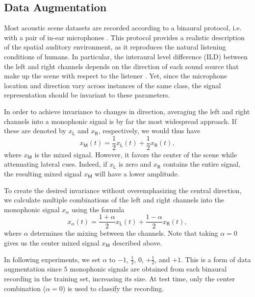 \documentclass{article}
\begin{document}
\begin{sloppy}
\section{Data Augmentation}
\label{sec:augment}

Most acoustic scene datasets are recorded according to a binaural protocol, i.e. with a pair of in-ear microphones \cite{Wang2006}. This protocol provides a realistic description of the spatial auditory environment, as it reproduces the natural listening conditions of humans. In particular, the interaural level difference (ILD) between the left and right channels depends on the direction of each sound source that make up the scene with respect to the listener \cite{Blauert2004}. Yet, since the microphone location and direction vary across instances of the same class, the signal representation should be invariant to these parameters.

In order to achieve invariance to changes in direction, averaging the left and right channels into a monophonic signal is by far the most widespread approach.  If these are denoted by $x_{\mathsf{L}}$ and $x_{\mathsf{R}}$, respectively, we would thus have
\begin{equation}
	x_{\mathsf{M}}(t) = \frac{1}{2} x_{\mathsf{L}}(t) + \frac{1}{2} x_{\mathsf{R}}(t),
\end{equation}
where $x_{\mathsf{M}}$ is the mixed signal. However, it favors the center of the scene while attenuating lateral cues. Indeed, if $x_{\mathsf{L}}$ is zero and $x_{\mathsf{R}}$ contains the entire signal, the resulting mixed signal $x_{\mathsf{M}}$ will have a lower amplitude.

To create the desired invariance without overemphasizing the central direction, we calculate multiple combinations of the left and right channels into the monophonic signal $x_{\alpha}$ using the formula
\begin{equation}
x_{\alpha}(t) =
\dfrac{1+\alpha}{2} x_{\mathsf{L}}(t) +
\dfrac{1-\alpha}{2} x_{\mathsf{R}}(t),
\end{equation}
where $\alpha$ determines the mixing between the channels. Note that taking $\alpha = 0$ gives us the center mixed signal $x_{\mathsf{M}}$ described above.

In following experiments, we set $\alpha$ to $-1$, $\frac{1}{2}$, $0$, $+\frac{1}{2}$, and $+1$. This is a form of data augmentation since $5$ monophonic signals are obtained from each binaural recording in the training set, increasing its size. At test time, only the center combination ($\alpha = 0$) is used to classify the recording.


\end{sloppy}
\end{document}
